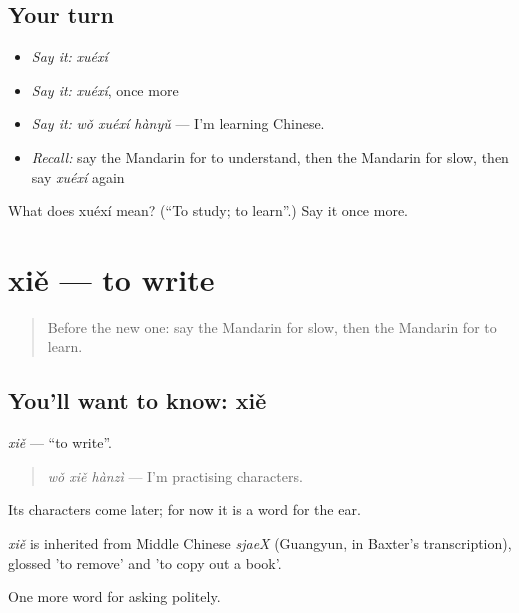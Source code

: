\subsection*{Your turn}
\begin{itemize}
\raggedright
  \item \emph{Say it:} \emph{xuéxí}
  \item \emph{Say it:} \emph{xuéxí}, once more
  \item \emph{Say it:} \emph{wǒ xuéxí hànyǔ} — I'm learning Chinese.
  \item \emph{Recall:} say the Mandarin for to understand, then the Mandarin for slow, then say \emph{xuéxí} again
\end{itemize}

\begin{tcolorbox}[breakable,colback=teal!4,colframe=teal!35!black,title={Before you move on}]
What does xuéxí mean? (\textquotedblleft{}To study; to learn\textquotedblright{}.) Say it once more.
\end{tcolorbox}
\section[xiě]{xiě — to write}

\label{lesson:ZH-C54-xie}



\begin{quote}
Before the new one: say the Mandarin for slow, then the Mandarin for to learn.
\end{quote}

\subsection*{You'll want to know: xiě}
\emph{xiě} — \textquotedblleft{}to write\textquotedblright{}.

\begin{quote}
\emph{wǒ xiě hànzì} — I'm practising characters.
\end{quote}

Its characters come later; for now it is a word for the ear.

\begin{cousinweb}
\emph{xiě} is inherited from Middle Chinese \emph{sjaeX} (Guangyun, in Baxter's transcription), glossed 'to remove' and 'to copy out a book'.
\end{cousinweb}

\begin{grammarlens}[title={What you've built}]
One more word for asking politely.
\end{grammarlens}

